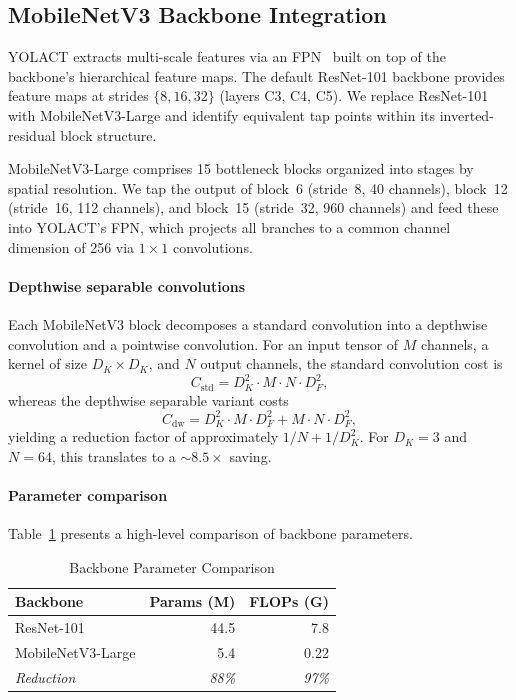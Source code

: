\documentclass[conference]{IEEEtran}
\begin{document}
\subsection{MobileNetV3 Backbone Integration}
\label{sec:backbone}

YOLACT extracts multi-scale features via an FPN~\cite{lin2017fpn} built on
top of the backbone's hierarchical feature maps. The default ResNet-101
backbone provides feature maps at strides $\{8, 16, 32\}$ (layers C3, C4,
C5). We replace ResNet-101 with MobileNetV3-Large and identify
equivalent tap points within its inverted-residual block structure.

MobileNetV3-Large comprises 15 bottleneck blocks organized into
stages by spatial resolution. We tap the output of block~6
(stride~8, 40 channels), block~12 (stride~16, 112 channels), and
block~15 (stride~32, 960 channels) and feed these into YOLACT's FPN,
which projects all branches to a common channel dimension of 256 via
$1\times 1$ convolutions.

\paragraph{Depthwise separable convolutions}
Each MobileNetV3 block decomposes a standard convolution into a depthwise
convolution and a pointwise convolution. For an input tensor of
$M$ channels, a kernel of size $D_K \times D_K$, and $N$ output channels,
the standard convolution cost is
\begin{equation}
  C_{\text{std}} = D_K^{2} \cdot M \cdot N \cdot D_F^{2},
  \label{eq:conv_std}
\end{equation}
whereas the depthwise separable variant costs
\begin{equation}
  C_{\text{dw}} = D_K^{2} \cdot M \cdot D_F^{2} + M \cdot N \cdot D_F^{2},
  \label{eq:conv_dw}
\end{equation}
yielding a reduction factor of approximately $1/N + 1/D_K^{2}$. For
$D_K=3$ and $N=64$, this translates to a ${\sim}8.5\times$ saving.

\paragraph{Parameter comparison}
Table~\ref{tab:params} presents a high-level comparison of backbone
parameters.

\begin{table}[t]
  \centering
  \caption{Backbone Parameter Comparison}
  \label{tab:params}
  \begin{tabular}{@{}lrr@{}}
    \toprule
    Backbone & Params (M) & FLOPs (G) \\
    \midrule
    ResNet-101        & 44.5 & 7.8 \\
    MobileNetV3-Large & 5.4  & 0.22 \\
    \midrule
    \textit{Reduction} & \textit{88\%} & \textit{97\%} \\
    \bottomrule
  \end{tabular}
\end{table}
\end{document}
